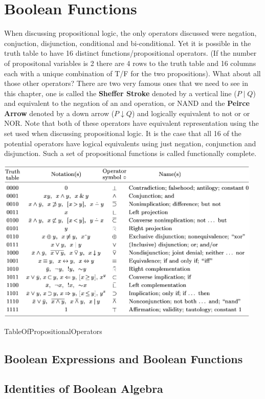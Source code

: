 \documentclass[11pt]{book} %
\theoremstyle {definition}
\theoremstyle {remark}
\begin{document}
\section {Boolean Functions}
When discussing propositional logic, the only operators discussed were negation, conjuction, disjunction, conditional and bi-conditional. Yet it is possible in the truth table to have 16 distinct functions/propositional operators. (If the number of propositonal variables is 2 there are 4 rows to the truth table and 16 columns each with a unique combination of T/F for the two propositions). What about all those other operators? There are two very famous ones that we need to see in this chapter, one is called the \textbf{Sheffer Stroke} denoted by a vertical line ($P \mid Q$) and equivalent to the negation of an and operation, or NAND and the \textbf{Peirce Arrow} denoted by a down arrow ($P \downarrow Q$) and logically equivalent to not or or NOR. Note that both of these operators have equivalent representation using the set used when discussing propositional logic. It is the case that all 16 of the potential operators have logical equivalents using just negation, conjunction and disjunction. Such a set of propositional functions is called functionally complete. 
    \begin{table}[htbp]
   \centering
   \includegraphics [width=5in]{TableOfPropositionalOperators}
   \caption{TableOfPropositionalOperators}
   \label{table:TableOfPropositionalOperators}
\end{table}

    \subsection {Boolean Expressions and Boolean Functions}
    \subsection {Identities of Boolean Algebra}
\end{document}
